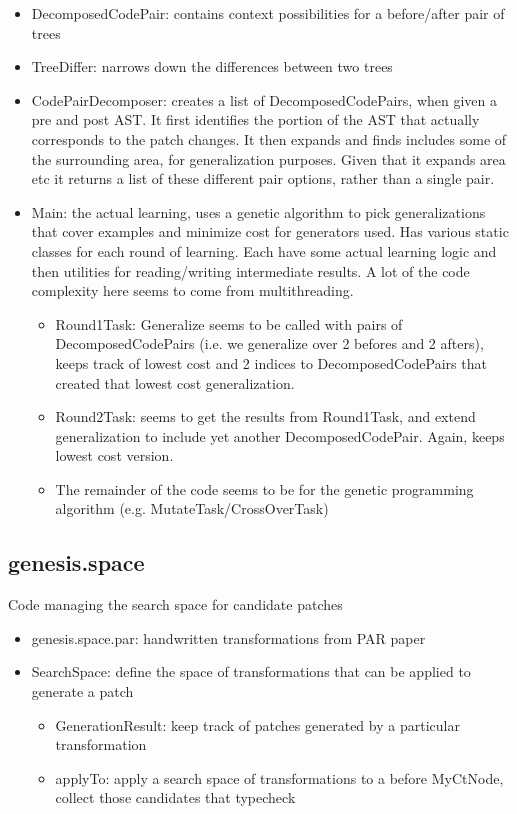 \documentclass{article}
\begin{document}
\begin{itemize}
	\item DecomposedCodePair: contains context possibilities for a before/after pair of trees
	\item TreeDiffer: narrows down the differences between two trees
	\item CodePairDecomposer: creates a list of DecomposedCodePairs, when given a pre and post AST. It first identifies the portion of the AST
	that actually corresponds to the patch changes. It then expands and finds includes some of the surrounding area, for generalization purposes. Given
	that it expands area etc it returns a list of these different pair options, rather than a single pair.
	\item Main: the actual learning, uses a genetic algorithm to pick generalizations that cover examples and minimize cost for generators
  used. Has various static classes for each round of learning. Each have some actual learning logic and then utilities for reading/writing
  intermediate results. A lot of the code complexity here seems to come from multithreading.
	\begin{itemize}
		\item Round1Task: Generalize seems to be called with pairs of DecomposedCodePairs (i.e. we generalize over 2 befores and 2 afters), keeps
  track of lowest cost and 2 indices to DecomposedCodePairs that created that lowest cost generalization.
  		\item Round2Task: seems to get the results from Round1Task, and extend generalization to include yet another DecomposedCodePair. Again,
      keeps lowest cost version.
      		\item The remainder of the code seems to be for the genetic programming algorithm (e.g. MutateTask/CrossOverTask)
	\end{itemize}
\end{itemize}

\subsection{genesis.space}
Code managing the search space for candidate patches

\begin{itemize}
	\item genesis.space.par: handwritten transformations from PAR paper
	\item SearchSpace: define the space of transformations that can be applied to generate a patch
	\begin{itemize}
		\item GenerationResult: keep track of patches generated by a particular transformation
		\item applyTo: apply a search space of transformations to a before MyCtNode, collect those candidates that typecheck
	\end{itemize}
\end{itemize}
\end{document}

